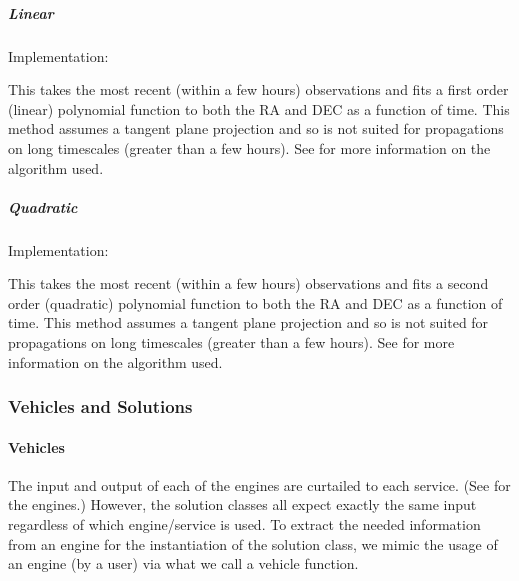 \documentclass[letterpaper,11pt,english]{sphinxmanual}
\begin{document}
\subparagraph{Linear}
\label{\detokenize{technical/architecture/services_engines:linear}}
\sphinxAtStartPar
Implementation: {\hyperref[\detokenize{code/opihiexarata.propagate.polynomial:opihiexarata.propagate.polynomial.LinearPropagationEngine}]{}}

\sphinxAtStartPar
This takes the most recent (within a few hours) observations and fits a
first order (linear) polynomial function to both the RA and DEC as a function
of time. This method assumes a tangent plane projection and so is not suited
for propagations on long timescales (greater than a few hours). See
{\hyperref[\detokenize{technical/algorithms/polynomial_propagation:technical-algorithms-polynomial-propagation}]{}} for more information on the
algorithm used.


\subparagraph{Quadratic}
\label{\detokenize{technical/architecture/services_engines:quadratic}}
\sphinxAtStartPar
Implementation: {\hyperref[\detokenize{code/opihiexarata.propagate.polynomial:opihiexarata.propagate.polynomial.QuadraticPropagationEngine}]{}}

\sphinxAtStartPar
This takes the most recent (within a few hours) observations and fits a
second order (quadratic) polynomial function to both the RA and DEC as a
function of time. This method assumes a tangent plane projection and so is not
suited for propagations on long timescales (greater than a few hours). See
{\hyperref[\detokenize{technical/algorithms/polynomial_propagation:technical-algorithms-polynomial-propagation}]{}} for more information on the
algorithm used.

\sphinxstepscope


\subsubsection{Vehicles and Solutions}
\label{\detokenize{technical/architecture/vehicles_solutions:vehicles-and-solutions}}\label{\detokenize{technical/architecture/vehicles_solutions:technical-architecture-vehicles-solutions}}\label{\detokenize{technical/architecture/vehicles_solutions::doc}}

\paragraph{Vehicles}
\label{\detokenize{technical/architecture/vehicles_solutions:vehicles}}
\sphinxAtStartPar
The input and output of each of the engines are curtailed to each service.
(See {\hyperref[\detokenize{technical/architecture/services_engines:technical-architecture-services-engines}]{}} for the engines.)
However, the solution classes all expect exactly the same input regardless
of which engine/service is used. To extract the needed information from an
engine for the instantiation of the solution class, we mimic the usage of an
engine (by a user) via what we call a vehicle function.
\end{document}
